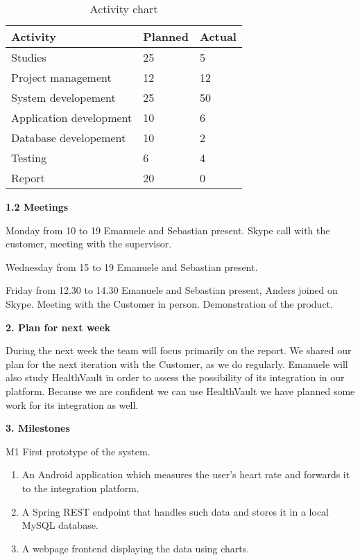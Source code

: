 \begin{table}[H]
\begin{center}
\begin{tabular}{ l | l | l }
  \hline
  Activity & Planned & Actual \\
  \hline\noalign{\smallskip}\noalign{\smallskip}\hline
  Studies & 25 & 5 \\
  Project management & 12 & 12 \\
  System developement & 25 & 50 \\
  Application development & 10 & 6 \\
  Database developement & 10 & 2 \\
  Testing & 6 & 4 \\
  Report & 20 & 0 \\
  \hline
\end{tabular}
\end{center}
\caption{Activity chart}
\label{table:activityChartStatusReportWeek38}
\end{table}

\textbf{1.2 Meetings}

Monday from 10 to 19
Emanuele and Sebastian present.
Skype call with the customer, meeting with the supervisor.

Wednesday from 15 to 19
Emanuele and Sebastian present.

Friday from 12.30 to 14.30
Emanuele and Sebastian present, Anders joined on Skype.
Meeting with the Customer in person. Demonstration of the product.

\textbf{2. Plan for next week}

During the next week the team will focus primarily on the report.
We shared our plan for the next iteration with the Customer, as we do regularly. 
Emanuele will also study HealthVault in order to assess the possibility of its integration in our platform. 
Because we are confident we can use HealthVault  we have planned some work for its integration as well.

\textbf{3. Milestones}

M1 First prototype of the system.

\begin{enumerate}
\item An Android application which measures the user’s heart rate and forwards it to the integration platform.
\item A Spring REST endpoint that handles such data and stores it in a local MySQL database.
\item A webpage frontend displaying the data using charts.
\end{enumerate}

